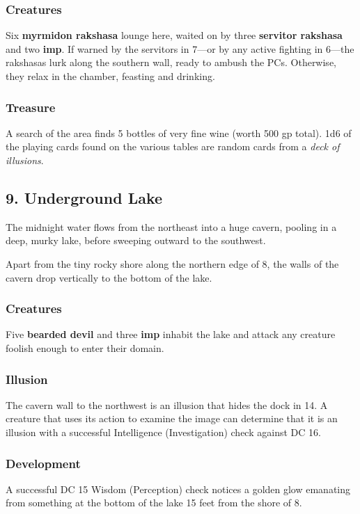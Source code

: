 \documentclass[10pt,a4paper,twoside,bg=print,twocolumn,openany,nodeprecatedcode]{dndbook}
\begin{document}
\subsubsection{Creatures}
Six \textbf{myrmidon rakshasa} lounge here, waited on by three \textbf{servitor rakshasa} and two \textbf{imp}. If warned by the servitors in 7—or by any active fighting in 6—the rakshasas lurk along the southern wall, ready to ambush the PCs. Otherwise, they relax in the chamber, feasting and drinking.

\subsubsection{Treasure}
A search of the area finds 5 bottles of very fine wine (worth 500 gp total). 1d6 of the playing cards found on the various tables are random cards from a \textit{deck of illusions}.

\subsection{9. Underground Lake}
\begin{DndReadAloud}{}
The midnight water flows from the northeast into a huge cavern, pooling in a deep, murky lake, before sweeping outward to the southwest.

\end{DndReadAloud}

Apart from the tiny rocky shore along the northern edge of 8, the walls of the cavern drop vertically to the bottom of the lake.

\subsubsection{Creatures}
Five \textbf{bearded devil} and three \textbf{imp} inhabit the lake and attack any creature foolish enough to enter their domain.

\subsubsection{Illusion}
The cavern wall to the northwest is an illusion that hides the dock in 14. A creature that uses its action to examine the image can determine that it is an illusion with a successful Intelligence (Investigation) check against DC 16.

\subsubsection{Development}
A successful DC 15 Wisdom (Perception) check notices a golden glow emanating from something at the bottom of the lake 15 feet from the shore of 8.
\end{document}
